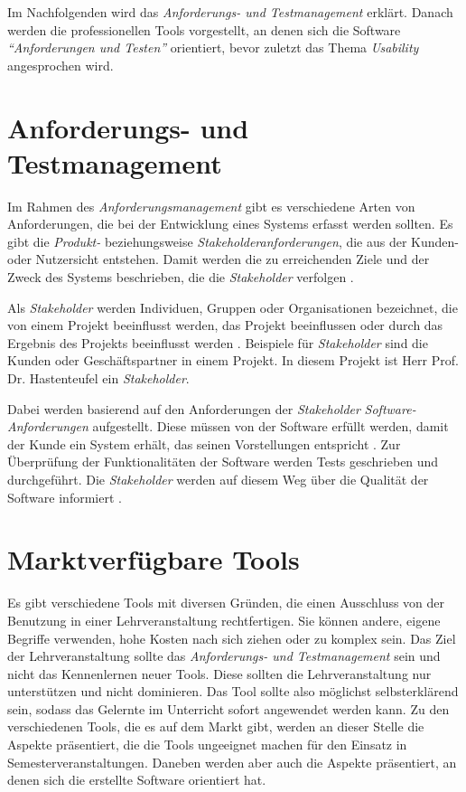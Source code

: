 \documentclass[11pt,a4paper]{report}
\begin{document}
Im Nachfolgenden wird das \textit{Anforderungs- und Testmanagement} erklärt. Danach werden die professionellen Tools vorgestellt, an denen sich die Software  \textit{"`Anforderungen und Testen"'} orientiert, bevor zuletzt das Thema \textit{Usability} angesprochen wird.

\section{Anforderungs- und Testmanagement} 
\label{s:anfundtest}

Im Rahmen des \textit{Anforderungsmanagement} gibt es verschiedene Arten von Anforderungen, die bei der Entwicklung eines Systems erfasst werden sollten. Es gibt die \textit{Produkt-} beziehungsweise \textit{Stakeholderanforderungen}, die aus der Kunden- oder Nutzersicht entstehen. Damit werden die zu erreichenden Ziele und der Zweck des Systems beschrieben, die die \textit{Stakeholder} verfolgen \cite{htm}. 

Als \textit{Stakeholder} werden Individuen, Gruppen oder Organisationen bezeichnet, die von einem Projekt beeinflusst werden, das Projekt beeinflussen oder durch das Ergebnis des Projekts beeinflusst werden \cite{pmbok}. Beispiele für \textit{Stakeholder} sind die Kunden oder Geschäftspartner in einem Projekt. In diesem Projekt ist Herr Prof. Dr. Hastenteufel ein \textit{Stakeholder}.


Dabei werden basierend auf den Anforderungen der \textit{Stakeholder} \textit{Software-Anforderungen} aufgestellt. Diese müssen von der Software erfüllt werden, damit der Kunde ein System erhält, das seinen Vorstellungen entspricht \cite{htm}. Zur Überprüfung der Funktionalitäten der Software werden Tests geschrieben und durchgeführt. Die \textit{Stakeholder} werden auf diesem Weg über die Qualität der Software informiert \cite{powerpoint}.


\section{Marktverfügbare Tools} 
\label{chap:Tools}


Es gibt verschiedene Tools mit diversen Gründen, die einen Ausschluss von der Benutzung in einer Lehrveranstaltung rechtfertigen. Sie können andere, eigene Begriffe verwenden, hohe Kosten nach sich ziehen oder zu komplex sein. Das Ziel der Lehrveranstaltung sollte das \textit{Anforderungs- und Testmanagement} sein und nicht das Kennenlernen neuer Tools. Diese sollten die Lehrveranstaltung nur unterstützen und nicht dominieren. Das Tool sollte also möglichst selbsterklärend sein, sodass das Gelernte im Unterricht sofort angewendet werden kann. Zu den verschiedenen Tools, die es auf dem Markt gibt, werden an dieser Stelle die Aspekte präsentiert, die die Tools ungeeignet machen für den Einsatz in Semesterveranstaltungen. Daneben werden aber auch die Aspekte präsentiert, an denen sich die erstellte Software orientiert hat.
\end{document}
